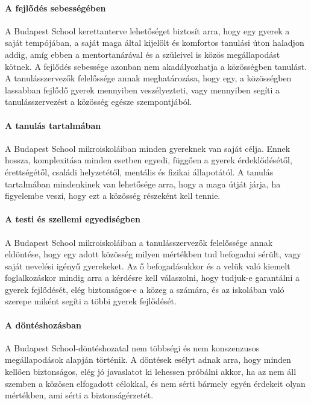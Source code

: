 \paragraph{A fejlődés sebességében}

  A Budapest School kerettanterve lehetőséget biztosít arra, hogy egy
  gyerek a saját tempójában, a saját maga által kijelölt és komfortos
  tanulási úton haladjon addig, amíg ebben a mentortanárával és a
  szüleivel is közös megállapodást kötnek. A fejlődés sebessége azonban
  nem akadályozhatja a közösségben tanulást. A tanulásszervezők
  felelőssége annak meghatározása, hogy egy, a közösségben lassabban
  fejlődő gyerek mennyiben veszélyezteti, vagy mennyiben segíti a
  tanulásszervezést a közösség egésze szempontjából.


\paragraph{A tanulás tartalmában}


  A Budapest School mikroiskoláiban minden gyereknek van saját célja.
  Ennek hossza, komplexitása minden esetben egyedi, függően a gyerek
  érdeklődésétől, érettségétől, családi helyzetétől, mentális és fizikai
  állapotától. A tanulás tartalmában mindenkinek van lehetősége arra,
  hogy a maga útját járja, ha figyelembe veszi, hogy ezt a közösség
  részeként kell tennie.


\paragraph{A testi és szellemi egyediségben}

  A Budapest School mikroiskoláiban a tanulásszervezők felelőssége annak
  eldöntése, hogy egy adott közösség milyen mértékben tud befogadni
  sérült, vagy saját nevelési igényű gyerekeket. Az ő befogadásukkor és
  a velük való kiemelt foglalkozáskor mindig arra a kérdésre kell
  válaszolni, hogy tudjuk-e garantálni a gyerek fejlődését, elég
  biztonsá\-gos-e a közeg a számára, és az iskolában való szerepe miként
  segíti a többi gyerek fejlődését.


\paragraph{A döntéshozásban}

  A Budapest School-döntéshozatal nem többségi és nem konszenzusos
  megállapodások alapján történik. A döntések esélyt adnak arra, hogy
  minden kellően biztonságos, elég jó javaslatot ki lehessen próbálni
  akkor, ha az nem áll szemben a közösen elfogadott célokkal, és nem
  sérti  bármely egyén érdekeit olyan mértékben, ami sérti a
  biztonságérzetét.

